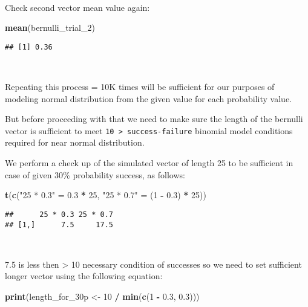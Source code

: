 \documentclass[]{article}
\newenvironment{Shaded}{\begin{snugshade}}{\end{snugshade}}
\newcommand{\DecValTok}[1]{\textcolor[rgb]{0.00,0.00,0.81}{#1}}
\newcommand{\FloatTok}[1]{\textcolor[rgb]{0.00,0.00,0.81}{#1}}
\newcommand{\KeywordTok}[1]{\textcolor[rgb]{0.13,0.29,0.53}{\textbf{#1}}}
\newcommand{\NormalTok}[1]{#1}
\newcommand{\OperatorTok}[1]{\textcolor[rgb]{0.81,0.36,0.00}{\textbf{#1}}}
\newcommand{\StringTok}[1]{\textcolor[rgb]{0.31,0.60,0.02}{#1}}
\begin{document}
~

Check second vector mean value again:

\begin{Shaded}
\begin{Highlighting}[]
\KeywordTok{mean}\NormalTok{(bernulli_trial_}\DecValTok{2}\NormalTok{)}
\end{Highlighting}
\end{Shaded}

\begin{verbatim}
## [1] 0.36
\end{verbatim}

~

Repeating this process = 10K times will be sufficient for our purposes
of modeling normal distribution from the given value for each
probability value.

But before proceeding with that we need to make sure the length of the
bernulli vector is sufficient to meet
\texttt{10\ \textgreater{}\ success-failure} binomial model conditions
required for near normal distribution.

We perform a check up of the simulated vector of length 25 to be
sufficient in case of given 30\% probability success, as follows:

\begin{Shaded}
\begin{Highlighting}[]
\KeywordTok{t}\NormalTok{(}\KeywordTok{c}\NormalTok{(}\StringTok{"25 * 0.3"}\NormalTok{ =}\StringTok{ }\FloatTok{0.3} \OperatorTok{*}\StringTok{ }\DecValTok{25}\NormalTok{, }\StringTok{"25 * 0.7"}\NormalTok{ =}\StringTok{ }\NormalTok{(}\DecValTok{1} \OperatorTok{-}\StringTok{ }\FloatTok{0.3}\NormalTok{) }\OperatorTok{*}\StringTok{ }\DecValTok{25}\NormalTok{))}
\end{Highlighting}
\end{Shaded}

\begin{verbatim}
##      25 * 0.3 25 * 0.7
## [1,]      7.5     17.5
\end{verbatim}

~

7.5 is less then \textgreater{} 10 necessary condition of successes so
we need to set sufficient longer vector using the following equation:

\begin{Shaded}
\begin{Highlighting}[]
\KeywordTok{print}\NormalTok{(length_for_30p <-}\StringTok{ }\DecValTok{10} \OperatorTok{/}\StringTok{ }\KeywordTok{min}\NormalTok{(}\KeywordTok{c}\NormalTok{(}\DecValTok{1} \OperatorTok{-}\StringTok{ }\FloatTok{0.3}\NormalTok{, }\FloatTok{0.3}\NormalTok{)))}
\end{Highlighting}
\end{Shaded}
\end{document}
